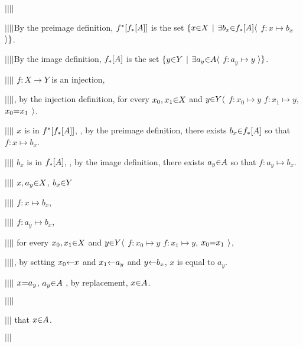         $|$\hs$|$\hs$|$\hs$|$\hs \par
        $|$\hs$|$\hs$|$\hs$|$\hs By the preimage definition, $f^*[f_*[\g A]]$ is the set $\a\{x \p\in X \pipe \a\exists b_x \p\in f_*[\g A] \a\langle$ $f: x   \mapsto b_x$ $\a\rangle \a\}$. \par
        $|$\hs$|$\hs$|$\hs$|$\hs By the image definition,        $f_*[\g A]$  is the set $\a\{y \p\in Y \pipe \a\exists a_y \p\in     \g A  \a\langle$ $f: a_y \mapsto y$   $\a\rangle \a\}$. \par
        $|$\hs$|$\hs$|$\hs$|$\hs {} $f: X \to Y$ is an injection, \par
        $|$\hs$|$\hs$|$\hs$|$\hs {}, by the injection definition, for every $x_0,x_1 \p\in X$ and $y \p\in Y \a\langle$  $f:x_0 \mapsto y$  $f: x_1 \mapsto y$,  $x_0 \p= x_1$ $\a\rangle$. \par
        $|$\hs$|$\hs$|$\hs$|$\hs {} $x$   is in $f^*[f_*[\g A]]$, , by the preimage definition, there exists $b_x \p\in f_*[\g A]$ so that $f: x   \mapsto b_x$. \par
        $|$\hs$|$\hs$|$\hs$|$\hs {} $b_x$ is in     $f_*[\g A]$,  , by the image definition,    there exists $a_y \p\in     \g A$  so that $f: a_y \mapsto b_x$. \par
        $|$\hs$|$\hs$|$\hs$|$\hs {} $x,a_y \p\in X$,  $b_x \p\in Y$ \par
        $|$\hs$|$\hs$|$\hs$|$\hs {}   $f: x   \mapsto b_x$, \par
        $|$\hs$|$\hs$|$\hs$|$\hs {}   $f: a_y \mapsto b_x$, \par
        $|$\hs$|$\hs$|$\hs$|$\hs {}   for every $x_0,x_1 \p\in X$ and $y \p\in Y \a\langle$  $f:x_0 \mapsto y$  $f: x_1 \mapsto y$,  $x_0 \p= x_1$ $\a\rangle$, \par
        $|$\hs$|$\hs$|$\hs$|$\hs {}, by setting $x_0 \p\leftarrow x$ and $x_1 \p\leftarrow a_y$ and $y \p\leftarrow b_x$, $x$ is equal to $a_y$. \par
        $|$\hs$|$\hs$|$\hs$|$\hs {} $x \p= a_y$,  $a_y \p\in \g A$ , by replacement, $x \p\in \g A$. \par
        $|$\hs$|$\hs$|$\hs$|$\hs \par

      $|$\hs$|$\hs$|$\hs {} that $x \p\in \g A$. \par
      $|$\hs$|$\hs$|$\hs \par

